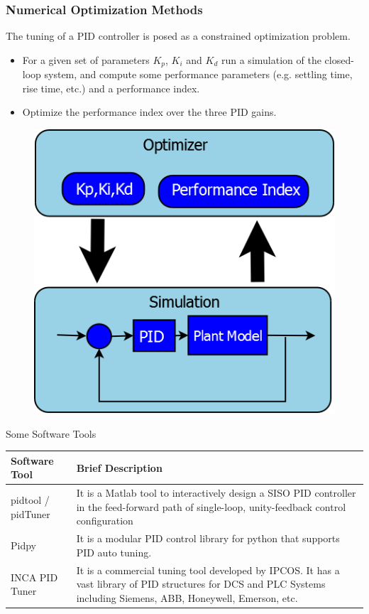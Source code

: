 \begin{frame}
	\small{
	\frametitle{Numerical Optimization Methods}
	The tuning of a PID controller is posed as a constrained optimization problem.  
	\begin{itemize}
			\item For a given set of parameters $K_p$, $K_i$ and $K_d$ run a simulation of the closed-loop system, and compute some performance parameters (e.g. settling time, rise time, etc.) and a performance index.
			\item Optimize the performance index over the three PID gains.
	\end{itemize}}
	\begin{figure}
	\includegraphics[width=0.3\linewidth]{img/PID_1}
	\end{figure}	
\end{frame}

\begin{frame}{Some Software Tools}
	\small{
	\begin{tabular}{|p{3cm}|p{7cm}|}
		\hline Software Tool  & Brief Description  \\ 
		\hline pidtool / pidTuner
		 & It is a Matlab tool to interactively design a SISO PID controller in the feed-forward path of single-loop, unity-feedback control configuration \\ 
		\hline Pidpy
		 & It is a modular PID control library for python that supports PID auto tuning. {\color{blue}{\url{https://pypi.python.org/pypi/pypid/}}}
		 \\ 
		\hline INCA PID Tuner
		 & It is a commercial tuning tool developed by IPCOS. It has a vast library of PID structures for DCS and PLC  Systems including Siemens, ABB, Honeywell, Emerson, etc.
		 {\color{blue}{\url{http://www.ipcos.com/advancedprocesscontrol/advanced-process-control/pid-tuning-software/inca-pid-tuning/}}}
		 \\ 
		\hline 
	\end{tabular}}
\end{frame}

